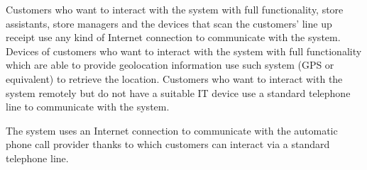 \documentclass[../../main.tex]{subfiles}
\begin{document}
Customers who want to interact with the system with full functionality, store
assistants, store managers and the devices that scan the customers' line up
receipt use any kind of Internet connection to communicate with the system.
Devices of customers who want to interact with the system with full
functionality which are able to provide geolocation information use such system
(GPS or equivalent) to retrieve the location. Customers who want to interact
with the system remotely but do not have a suitable IT device use a standard
telephone line to communicate with the system.

The system uses an Internet connection to communicate with the automatic phone
call provider thanks to which customers can interact via a standard telephone
line.
\end{document}
